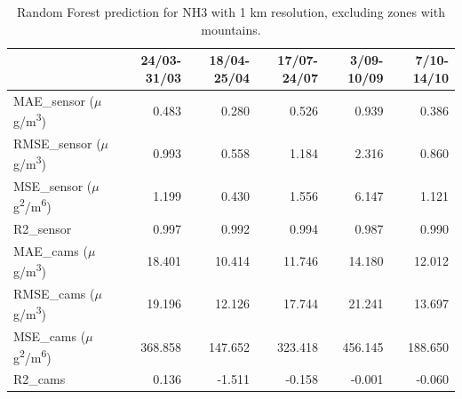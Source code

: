 \begin{table}[H]
\begin{tabular}{lrrrrr}
\toprule
 &  24/03-31/03 &  18/04-25/04 &  17/07-24/07 &  3/09-10/09 &  7/10-14/10 \\
\midrule
 MAE\_sensor ($\mu$g/m\textsuperscript{3})&        0.483 &        0.280 &        0.526 &       0.939 &       0.386 \\
RMSE\_sensor ($\mu$g/m\textsuperscript{3})&        0.993 &        0.558 &        1.184 &       2.316 &       0.860 \\
 MSE\_sensor ($\mu$g\textsuperscript{2}/m\textsuperscript{6})&        1.199 &        0.430 &        1.556 &       6.147 &       1.121 \\
  R2\_sensor &        0.997 &        0.992 &        0.994 &       0.987 &       0.990 \\
   MAE\_cams ($\mu$g/m\textsuperscript{3})&       18.401 &       10.414 &       11.746 &      14.180 &      12.012 \\
  RMSE\_cams ($\mu$g/m\textsuperscript{3})&       19.196 &       12.126 &       17.744 &      21.241 &      13.697 \\
   MSE\_cams ($\mu$g\textsuperscript{2}/m\textsuperscript{6})&      368.858 &      147.652 &      323.418 &     456.145 &     188.650 \\
    R2\_cams &        0.136 &       -1.511 &       -0.158 &      -0.001 &      -0.060 \\
\bottomrule
\end{tabular}
\caption{Random Forest prediction for NH3 with 1 km resolution, excluding zones with mountains.}
\end{table}
